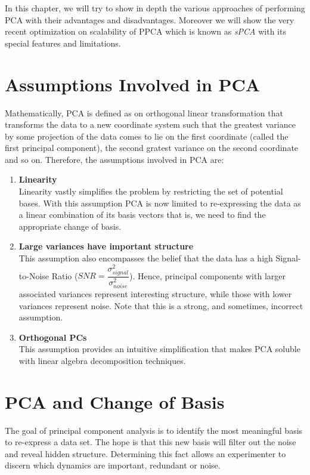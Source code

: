 In this chapter, we will try to show in depth the various approaches of performing PCA with their advantages and disadvantages. Moreover we will show the very recent optimization on scalability of PPCA which is known as \textit{sPCA} with its special features and limitations.

\section{Assumptions Involved in PCA}
Mathematically, PCA is defined as on orthogonal linear transformation that transforms the data to a new coordinate system such that the greatest variance by some projection of the data comes to lie on the first coordinate (called the first principal component), the second gratest variance on the second coordinate and so on. Therefore, the assumptions involved in PCA are:

\begin{enumerate}
\item \textbf{Linearity}\\
Linearity vastly simplifies the problem by restricting the set of potential bases. With this
assumption PCA is now limited to re-expressing the data as a linear combination of its
basis vectors that is, we need to find the appropriate change of basis.
\item \textbf{Large variances have important structure}\\
This assumption also encompasses the belief that the data has a high Signal-to-Noise
Ratio ($SNR = \dfrac{\sigma_{signal}^2}{\sigma_{noise}^2}$). Hence, principal components with larger associated variances represent interesting structure, while those with lower variances represent noise.
Note that this is a strong, and sometimes, incorrect assumption.
\item \textbf{Orthogonal PCs}\\
This assumption provides an intuitive simplification that makes PCA soluble with linear algebra decomposition techniques.  
\end{enumerate}

\section{PCA and Change of Basis}
The goal of principal component analysis is to identify the most meaningful basis to re-express a data set. The hope is that this new basis will filter out the noise and reveal hidden structure. Determining this fact allows an experimenter to discern which dynamics are important, redundant or noise. 



